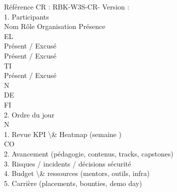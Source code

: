 \vspace{0.5em}
Référence CR : RBK-W3S-CR-                        Version :\\
\vspace{0.5em}
\vspace{0.5em}
\vspace{0.5em}
\vspace{0.5em}
1. Participants\\
\vspace{0.5em}
Nom                                      Rôle                       Organisation             Présence\\
\vspace{0.5em}
\vspace{0.5em}
\vspace{0.5em}
\vspace{0.5em}
EL\\
Présent / Excusé\\
Présent / Excusé\\
\vspace{0.5em}
\vspace{0.5em}
\vspace{0.5em}
\vspace{0.5em}
TI\\
Présent / Excusé\\
\vspace{0.5em}
\vspace{0.5em}
\vspace{0.5em}
\vspace{0.5em}
N\\
DE\\
FI\\
2. Ordre du jour\\
\vspace{0.5em}
\vspace{0.5em}
\vspace{0.5em}
N\\
1. Revue KPI \textbackslash{}& Heatmap (semaine                   )\\
CO\\
2. Avancement (pédagogie, contenus, tracks, capstones)\\
\vspace{0.5em}
3. Risques / incidents / décisions sécurité\\
\vspace{0.5em}
4. Budget \textbackslash{}& ressources (mentors, outils, infra)\\
\vspace{0.5em}
5. Carrière (placements, bounties, demo day)\\
